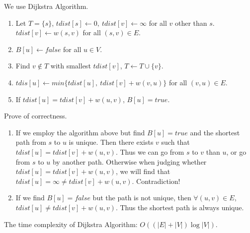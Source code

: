\documentclass{oxmathproblems}
\begin{document}
\begin{questions}
\miquestion
We use Dijkstra Algorithm.
\begin{enumerate}
    \item Let $T=\{s\}$, $tdist[s]\leftarrow0,\ tdist[v]\leftarrow \infty$ for all $v$ other than $s$. $tdist[v]\leftarrow w(s,v)$ for all $(s,v)\in E$.
    \item $B[u]\leftarrow false$ for all $u\in V$.
    \item Find $v\notin T$ with smallest $tdist[v]$, $T\leftarrow T\cup \{v\}$.
    \item $tdis[u] \leftarrow min\{tdist[u],\ tdist[v]+w(v,u)\}$ for all $(v,u)\in E$.
    \item If $tdist[u]=tdist[v]+w(u,v)$, $B[u]=true$.
\end{enumerate}
Prove of correctness.
\begin{enumerate}
    \item If we employ the algorithm above but find $B[u]=true$ and the shortest path from $s$ to $u$ is unique. 
Then there exists $v$ such that $tdist[u]=tdist[v]+w(u,v)$. Thus we can go from $s$ to $v$ than $u$, or go from $s$ to $u$ by another path. Otherwise when judging whether $tdist[u]=tdist[v]+w(u,v)$, we will find that $tdist[u]=\infty\neq tdist[v]+w(u,v)$. Contradiction!
    \item If we find $B[u]=false$ but the path is not unique, then $\forall(u,v)\in E$, $tdist[u]\neq tdist[v]+w(u,v)$.
Thus the shortest path is always unique.
\end{enumerate}
The time complexity of Dijkstra Algorithm: $O((|E|+|V|)\log |V|)$.

\miquestion
{}
\end{questions}
\end{document}
